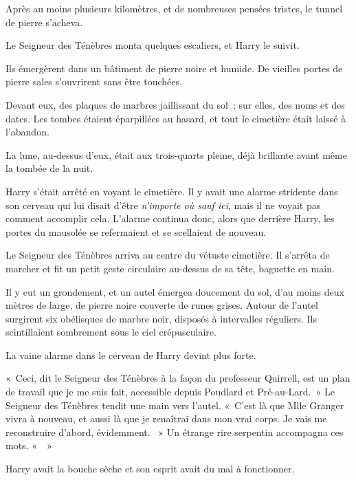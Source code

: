 Après au moins plusieurs kilomètres, et de nombreuses pensées tristes, le tunnel de pierre s'acheva.

Le Seigneur des Ténèbres monta quelques escaliers, et Harry le suivit.

Ils émergèrent dans un bâtiment de pierre noire et humide.
De vieilles portes de pierre sales s'ouvrirent sans être touchées.

Devant eux, des plaques de marbres jaillissant du sol~; sur elles, des noms et des dates.
Les tombes étaient éparpillées au hasard, et tout le cimetière était laissé à l'abandon.

La lune, au-dessus d'eux, était aux trois-quarts pleine, déjà brillante avant même la tombée de la nuit.

Harry s'était arrêté en voyant le cimetière.
Il y avait une alarme stridente dans son cerveau qui lui disait d'être \emph{n'importe où sauf ici}, mais il ne voyait pas comment accomplir cela.
L'alarme continua donc, alors que derrière Harry, les portes du mausolée se refermaient et se scellaient de nouveau.

Le Seigneur des Ténèbres arriva au centre du vétuste cimetière.
Il s'arrêta de marcher et fit un petit geste circulaire au-dessus de sa tête, baguette en main.

Il y eut un grondement, et un autel émergea doucement du sol, d'au moins deux mètres de large, de pierre noire couverte de runes grises.
Autour de l'autel surgirent six obélisques de marbre noir, disposés à intervalles réguliers.
Ils scintillaient sombrement sous le ciel crépusculaire.

La vaine alarme dans le cerveau de Harry devint plus forte.

«~Ceci, dit le Seigneur des Ténèbres à la façon du professeur Quirrell, est un plan de travail que je me suis fait, accessible depuis Poudlard et Pré-au-Lard.~»
Le Seigneur des Ténèbres tendit une main vers l'autel.
«~C'est là que Mlle Granger vivra à nouveau, et aussi là que je renaîtrai dans mon vrai corps.
Je vais me reconstruire d'abord, évidemment.
~» Un étrange rire serpentin accompagna ces mots.
«~~»

Harry avait la bouche sèche et son esprit avait du mal à fonctionner.

